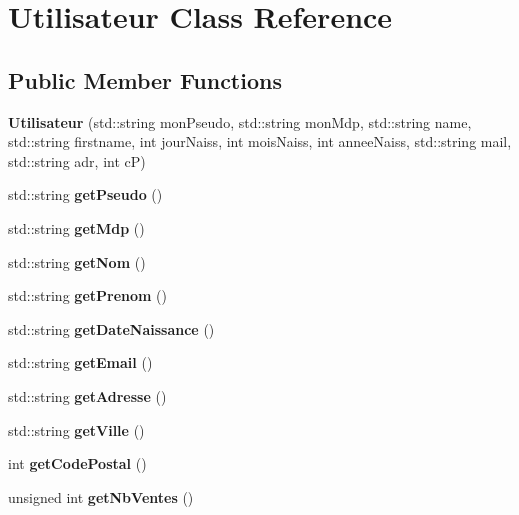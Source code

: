 \section{Utilisateur Class Reference}
\label{class_utilisateur}
\subsection*{Public Member Functions}
\begin{DoxyCompactItemize}
\item 
{\bfseries Utilisateur} (std\-::string mon\-Pseudo, std\-::string mon\-Mdp, std\-::string name, std\-::string firstname, int jour\-Naiss, int mois\-Naiss, int annee\-Naiss, std\-::string mail, std\-::string adr, int c\-P)\label{class_utilisateur_ac0d1108ddcc0db26aa0000fb7c9760c4}

\item 
std\-::string {\bfseries get\-Pseudo} ()\label{class_utilisateur_ad82476a41188fecf932e48ea4cf42162}

\item 
std\-::string {\bfseries get\-Mdp} ()\label{class_utilisateur_a7e889c1cb03acd4c06413bd254469e88}

\item 
std\-::string {\bfseries get\-Nom} ()\label{class_utilisateur_a0d78519577dbde31c5cfabcc39183d31}

\item 
std\-::string {\bfseries get\-Prenom} ()\label{class_utilisateur_a764e89d2416322187982d95403c3bbb5}

\item 
std\-::string {\bfseries get\-Date\-Naissance} ()\label{class_utilisateur_af40f31803cd81eb4eaeb2ccb6e08e8e0}

\item 
std\-::string {\bfseries get\-Email} ()\label{class_utilisateur_a3ef38f8bbb06f50534bc52e4932903ee}

\item 
std\-::string {\bfseries get\-Adresse} ()\label{class_utilisateur_a50c27d83b745ce9f93c016c078ff30d2}

\item 
std\-::string {\bfseries get\-Ville} ()\label{class_utilisateur_aa2228f7d22cc9765eae522bc996b3524}

\item 
int {\bfseries get\-Code\-Postal} ()\label{class_utilisateur_ac49c4d66a37d0296e50f9b6cedf4284f}

\item 
unsigned int {\bfseries get\-Nb\-Ventes} ()\label{class_utilisateur_a54a9cce39f989f920b93ca2675d6999c}


\end{DoxyCompactItemize}
